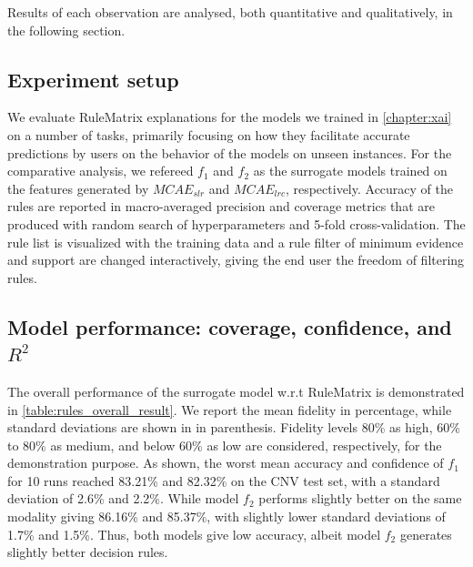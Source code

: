 \hspace*{3.5mm} Results of each observation are analysed, both quantitative and qualitatively, in the following section. 

\subsection{Experiment setup}
We evaluate RuleMatrix explanations for the models we trained in \cref{chapter:xai} on a number of tasks, primarily focusing on how they facilitate accurate predictions by users on the behavior of the models on unseen instances. For the comparative analysis, we refereed $f_1$ and $f_2$ as the surrogate models trained on the features generated by $MCAE_{slr}$ and $MCAE_{lrc}$, respectively.  
Accuracy of the rules are reported in macro-averaged precision and coverage metrics that are produced with random search of hyperparameters and 5-fold cross-validation. The rule list is visualized with the training data and a rule filter of minimum evidence and support are changed interactively, giving the end user the freedom of filtering rules. 

\subsection{Model performance: coverage, confidence, and $R^2$}
The overall performance of the surrogate model w.r.t RuleMatrix is demonstrated in \cref{table:rules_overall_result}. We report the mean fidelity in percentage, while standard deviations are shown in in parenthesis. Fidelity levels 80\% as high, 60\% to 80\% as medium, and below 60\% as low are considered, respectively, for the demonstration purpose. As shown, the worst mean accuracy and confidence of $f_1$ for 10 runs reached 83.21\% and 82.32\% on the CNV test set, with a standard deviation of 2.6\% and 2.2\%. While model $f_2$ performs slightly better on the same modality giving 86.16\% and 85.37\%, with slightly lower standard deviations of 1.7\% and 1.5\%. Thus, both models give low accuracy, albeit model $f_2$ generates slightly better decision rules. 

